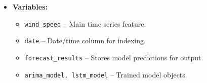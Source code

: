 \begin{itemize}
	\item \textbf{Variables:}
	\begin{itemize}
		\item \texttt{wind\_speed} – Main time series feature.
		\item \texttt{date} – Date/time column for indexing.
		\item \texttt{forecast\_results} – Stores model predictions for output.
		\item \texttt{arima\_model, lstm\_model} – Trained model objects.
	\end{itemize}
\end{itemize}




	









